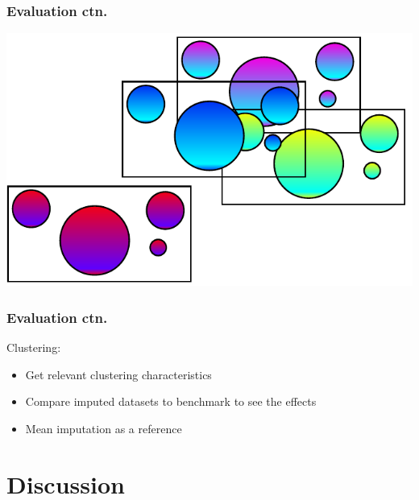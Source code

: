 \documentclass{beamer}
\begin{document}
\begin{frame}
  \frametitle{Evaluation ctn.}
  \centerline{\includegraphics[width=\paperwidth]{clustering}}
\end{frame}

\begin{frame}
  \frametitle{Evaluation ctn.}
  Clustering:
  \begin{itemize}
    \item Get relevant clustering characteristics
    \item Compare imputed datasets to benchmark to see the effects
    \item Mean imputation as a reference
  \end{itemize}
\end{frame}

\section{Discussion}
\subsection{}
\end{document}
